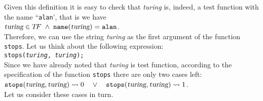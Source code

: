 Given this definition it is easy to check that \textsl{turing} is, indeed, a test function with the name
``\texttt{alan}', that is we have 
\\[0.3cm]
\hspace*{1.3cm} 
$\textsl{turing} \in T\!F \;\wedge\; \mathtt{name}(\textsl{turing}) = \mathtt{alan}$. 
\\[0.2cm]
Therefore, we can use the string \textsl{turing} as the first argument of the function
\texttt{stops}.  Let us think about the following expression:
\\[0.2cm]
\hspace*{1.3cm} 
\texttt{stops(\textsl{turing}, \textsl{turing});} 
\\[0.2cm]
Since we have already noted that \textsl{turing} is test function, according to the specification of
the function \texttt{stops} there are only two cases left:
\\[0.2cm]
\hspace*{1.3cm} 
$\mathtt{stops}(\textsl{turing}, \textsl{turing}) \leadsto 0 \quad \vee\quad
 \mathtt{stops}(\textsl{turing}, \textsl{turing}) \leadsto 1$. 
\\[0.2cm]
Let us consider these cases in turn.
